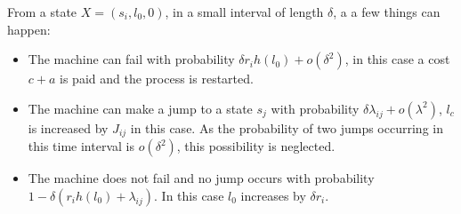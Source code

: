 From a state $X=(s_i,l_0,0)$, in a small interval of length $\delta$, a a few things can happen:
\begin{itemize}
\item The machine can fail with probability $\delta r_ih(l_0)+o(\delta^2)$, in this case a cost $c+a$ is paid and the process is restarted.
\item The machine can make a jump to a state $s_j$ with probability $\delta\lambda_{ij}+o(\lambda^2)$, $l_c$ is increased by $J_{ij}$ in this case. As the probability of two jumps occurring in this time interval is $o(\delta^2)$, this possibility is neglected.
\item The machine does not fail and no jump occurs with probability $1-\delta(r_ih(l_0)+\lambda_{ij})$. In this case $l_0$ increases by $\delta r_i$.
\end{itemize}

